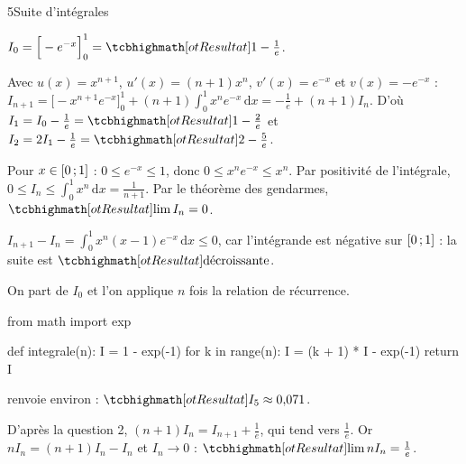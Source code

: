 \begin{corrigeBac}{5}{Suite d'intégrales}
\begin{questions}
  \item $I_0=\Big[-e^{-x}\Big]_0^1=\res{1-\tfrac1e}$. 
  \item Avec $u(x)=x^{n+1}$, $u'(x)=(n+1)x^{n}$, $v'(x)=e^{-x}$ et $v(x)=-e^{-x}$ :
    $I_{n+1}=\Big[-x^{n+1}e^{-x}\Big]_0^1+(n+1)\displaystyle\int_0^1x^{n}e^{-x}\,\mathrm{d}x=-\frac1e+(n+1)I_n$. D'où
    $I_1=I_0-\frac1e=\res{1-\tfrac2e}$ et $I_2=2I_1-\frac1e=\res{2-\tfrac5e}$. 
  \item Pour $x\in\mathopen{[}0\,{;}\,1\mathclose{]}$ : $0\leq e^{-x}\leq1$, donc $0\leq x^{n}e^{-x}\leq x^{n}$. Par positivité de l'intégrale,
    $0\leq I_n\leq\displaystyle\int_0^1x^{n}\,\mathrm{d}x=\frac{1}{n+1}$. Par le théorème des gendarmes, $\res{\lim I_n=0}$. 
  \item $I_{n+1}-I_n=\displaystyle\int_0^1x^{n}(x-1)e^{-x}\,\mathrm{d}x\leq0$, car l'intégrande est négative sur $\mathopen{[}0\,{;}\,1\mathclose{]}$ : la suite est
    $\res{\text{décroissante}}$. 
  \item On part de $I_0$ et l'on applique $n$ fois la relation de récurrence.
\begin{codecote}[0.5]
\begin{pythoncol}
from math import exp

def integrale(n):
    I = 1 - exp(-1)
    for k in range(n):
        I = (k + 1) * I - exp(-1)
    return I
\end{pythoncol}
\cote
{} renvoie environ  : $\res{I_5\approx0{,}071}$.
\end{codecote}
  \item D'après la question 2, $(n+1)I_n=I_{n+1}+\frac1e$, qui tend vers $\frac1e$. Or $nI_n=(n+1)I_n-I_n$ et $I_n\to0$ :
    $\res{\lim nI_n=\tfrac1e}$. 
\end{questions}
\end{corrigeBac}
